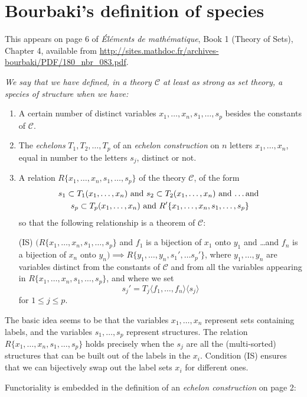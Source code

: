 \documentclass{amsart}
\theoremstyle{definition}
\theoremstyle{remark}
\begin{document}



\appendix
\section{Bourbaki's definition of species}
\label{sec:appendix-bourbaki}

This appears on page 6 of \emph{\'El\'ements de math\'ematique},
Book 1 (Theory of Sets), Chapter 4, available from
\url{http://sites.mathdoc.fr/archives-bourbaki/PDF/180_nbr_083.pdf}.

\begingroup \itshape
We say that we have defined, in a theory $\mathcal{C}$ at least as
strong as set theory, a \emph{species of structure} when we have:

\begin{enumerate}
\item A certain number of distinct variables $x_1, \dots, x_n, s_1,
  \dots, s_p$ besides the constants of $\mathcal{C}$.
\item The \emph{echelons} $T_1, T_2, \dots, T_p$ of an \emph{echelon
    construction} on $n$ letters $x_1, \dots, x_n$, equal in number to
  the letters $s_j$, distinct or not.
\item A relation $R\{x_1, \dots, x_n, s_1, \dots, s_p\}$ of the theory
  $\mathcal{C}$, of the form
  \begin{multline*}
    s_1 \subset T_1(x_1, \dots, x_n) \text{ and } s_2 \subset T_2(x_1,
    \dots, x_n) \text{ and \dots and } \\
    s_p \subset T_p(x_1, \dots, x_n) \text{ and } R'\{x_1, \dots, x_n,
    s_1, \dots, s_p\}
  \end{multline*}
  so that the following relationship is a theorem of $\mathcal{C}$:

  (IS) $(R\{x_1, \dots, x_n, s_1, \dots, s_p\}$ and $f_1$ is a
  bijection of $x_1$ onto $y_1$ and \dots and $f_n$ is a bijection of
  $x_n$ onto $y_n) \implies R\{y_1, \dots, y_n, s_1', \dots s_p'\}$,
  where $y_1, \dots, y_n$ are variables distinct from the constants of
  $\mathcal{C}$ and from all the variables appearing in $R\{x_1,
  \dots, x_n, s_1, \dots, s_p\}$, and where we set \[ s_j' =
  T_j\langle f_1, \dots, f_n\rangle \langle s_j \rangle \] for $1 \leq
  j \leq p$.
\end{enumerate}
\endgroup

The basic idea seems to be that the variables $x_1, \dots, x_n$
represent sets containing labels, and the variables $s_1, \dots, s_p$
represent structures.  The relation $R\{x_1, \dots, x_n, s_1, \dots,
s_p\}$ holds precisely when the $s_j$ are all the (multi-sorted)
structures that can be built out of the labels in the $x_i$.
Condition (IS) ensures that we can bijectively swap out the label sets
$x_i$ for different ones.

Functoriality is embedded in the definition of an \emph{echelon
  construction} on page 2:
\end{document}

